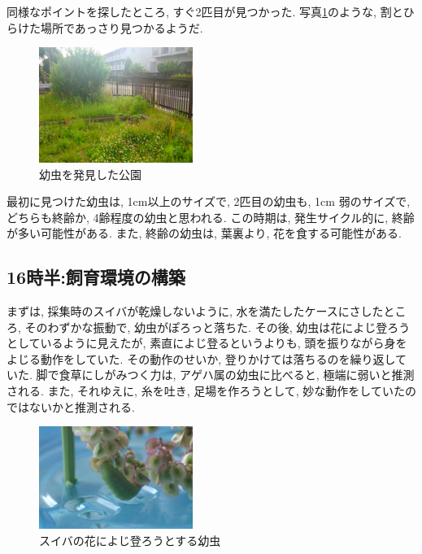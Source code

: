 \documentclass{jsarticle}
\begin{document}
同様なポイントを探したところ, すぐ2匹目が見つかった. 
写真\ref{pic-field}のような, 割とひらけた場所であっさり見つかるようだ. 
\begin{figure}[htbp]
  \begin{center}
    \includegraphics[width=5cm]{photo/park.JPG}
  \end{center}
  \caption{幼虫を発見した公園}
  \label{pic-field}
\end{figure}
最初に見つけた幼虫は, 1cm以上のサイズで, 2匹目の幼虫も, 1cm 弱のサイズで, どちらも終齢か, 4齢程度の幼虫と思われる. 
この時期は, 発生サイクル的に, 終齢が多い可能性がある. また, 終齢の幼虫は, 葉裏より, 花を食する可能性がある. 

\subsection{16時半:飼育環境の構築}
まずは, 採集時のスイバが乾燥しないように, 水を満たしたケースにさしたところ, そのわずかな振動で, 幼虫がぽろっと落ちた. 
その後, 幼虫は花によじ登ろうとしているように見えたが, 素直によじ登るというよりも, 頭を振りながら身をよじる動作をしていた. その動作のせいか, 登りかけては落ちるのを繰り返していた. 
脚で食草にしがみつく力は, アゲハ属の幼虫に比べると, 極端に弱いと推測される. 
また, それゆえに, 糸を吐き, 足場を作ろうとして, 妙な動作をしていたのではないかと推測される. 
\begin{figure}[htbp]
  \begin{center}
    \includegraphics[width=5cm]{photo/try_to_climb.JPG}
    \caption{スイバの花によじ登ろうとする幼虫}
    \label{pic-try-to-climb}
  \end{center}
\end{figure}
\end{document}
